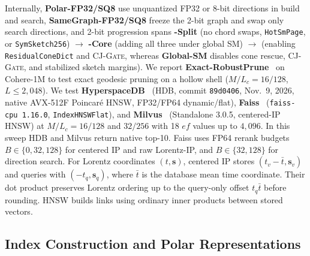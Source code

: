 Internally, \textbf{Polar-FP32/SQ8} use unquantized FP32 or 8-bit directions in build and search, \textbf{SameGraph-FP32/SQ8} freeze the 2-bit graph and swap only search directions, and 2-bit progression spans \textbf{\rquiver{}-Split} (no chord swaps, \texttt{HotSmPage}, or \texttt{SymSketch256}) $\to$ \textbf{\rquiver{}-Core} (adding all three under global {SM}) $\to$ \textbf{\rquiver{}} (enabling \texttt{ResidualConeDict} and \textsc{CJ-Gate}, whereas \textbf{Global-SM} disables cone rescue, \textsc{CJ-Gate}, and stabilized sketch margins).
We report \textbf{Exact-RobustPrune}~\cite{subramanya2019diskann,prokhorenkova2022hyperbolic} on {Cohere-1M} to test exact geodesic pruning on a hollow shell ($M/L_c=16/128$, $L\le2{,}048$). We test \textbf{HyperspaceDB}~\cite{glukhota2026hyperspacedb} (HDB, commit \texttt{89d0406}, Nov.\ 9, 2026, native AVX-512F Poincar\'e HNSW, FP32/FP64 dynamic/flat), \textbf{Faiss}~\cite{douze2024faiss} (\texttt{faiss-cpu 1.16.0}, \texttt{IndexHNSWFlat}), and \textbf{Milvus}~\cite{wang2021milvus} (Standalone 3.0.5, centered-IP HNSW) at $M/L_c=16/128$ and $32/256$ with 18 $ef$ values up to $4{,}096$. In this sweep HDB and Milvus return native top-10. Faiss uses FP64 rerank budgets $B\in\{0,32,128\}$ for centered IP and raw Lorentz-IP, and $B\in\{32,128\}$ for direction search. For Lorentz coordinates $(t,\mathbf{s})$, centered IP stores $(t_v-\bar t,\mathbf{s}_v)$ and queries with $(-t_q,\mathbf{s}_q)$, where $\bar t$ is the database mean time coordinate. Their dot product preserves Lorentz ordering up to the query-only offset $t_q\bar t$ before rounding. HNSW builds links using ordinary inner products between stored vectors.

\subsection{Index Construction and Polar Representations}
\label{subsec:eval_repr}

